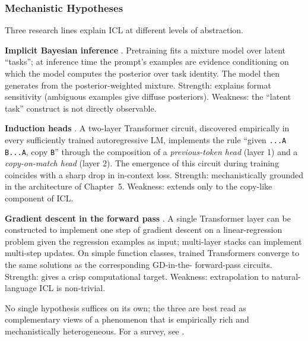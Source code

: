 \subsubsection{Mechanistic Hypotheses}

Three research lines explain ICL at different levels of abstraction.

\textbf{Implicit Bayesian inference}
\citep{xie2022explanation}. Pretraining fits a mixture model over
latent ``tasks''; at inference time the prompt's examples are
evidence conditioning on which the model computes the posterior over
task identity. The model then generates from the posterior-weighted
mixture. Strength: explains format sensitivity (ambiguous examples
give diffuse posteriors). Weakness: the ``latent task'' construct is
not directly observable.

\textbf{Induction heads} \citep{olsson2022induction}. A two-layer
Transformer circuit, discovered empirically in every sufficiently
trained autoregressive LM, implements the rule ``given
\texttt{...A B...A}, copy \texttt{B}'' through the composition of a
\emph{previous-token head} (layer 1) and a \emph{copy-on-match head}
(layer 2). The emergence of this circuit during training coincides
with a sharp drop in in-context loss. Strength: mechanistically
grounded in the architecture of Chapter~5. Weakness: extends only to
the copy-like component of ICL.

\textbf{Gradient descent in the forward pass}
\citep{garg2022transformers,vonoswald2023transformers}. A single
Transformer layer can be constructed to implement one step of
gradient descent on a linear-regression problem given the
regression examples as input; multi-layer stacks can implement
multi-step updates. On simple function classes, trained Transformers
converge to the same solutions as the corresponding GD-in-the-
forward-pass circuits. Strength: gives a crisp computational target.
Weakness: extrapolation to natural-language ICL is non-trivial.

No single hypothesis suffices on its own; the three are best read as
complementary views of a phenomenon that is empirically rich and
mechanistically heterogeneous. For a survey, see
\citet{dong2023survey}.

